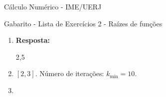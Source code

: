 \documentclass[a4paper,12pt,fleqn]{article}
\begin{document}
{\color{blue}

\begin{center}
\large
Cálculo Numérico - IME/UERJ 

Gabarito - Lista de Exercícios 2 - Raízes de funções
\end{center}

}

\vspace{0.8cm}

  \begin{enumerate}
    
     
    \item 
    
    {\color{blue}
    
    \textbf{Resposta:} 
    
%
%		

2,5
    
    } 
    
    \vspace{0.3cm}
    
    \item 
    
    {\color{blue}
    
    $[2,3]$. Número de iterações: $k_{\text{min}} = 10$.
    
    }   
    
    \vspace{0.6cm}    
      

\item 

{\color{blue}


}
\end{enumerate}
\end{document}
